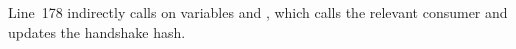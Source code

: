 \noindent
Line~178 indirectly calls  on variables
 and , which calls the 
relevant consumer and updates the handshake hash.








